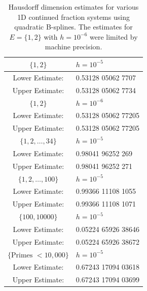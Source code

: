 \documentclass[10pt]{article}
\theoremstyle{definition}
\numberwithin{equation}{section}
\numberwithin{figure}{section}
\numberwithin{table}{section}
\begin{document}
\begin{table}[h]
\centering
\begin{tabular}{|c|l|}\hline
$\{1,2\}$&$h=10^{-5}$\\\hline
Lower Estimate: & 0.53128 05062 7707\\\hline
Upper Estimate: & 0.53128 05062 7734\\\hline\hline
$\{1,2\}$&$h=10^{-6}$\\\hline
Lower Estimate: & 0.53128 05062 77205\\\hline
Upper Estimate: & 0.53128 05062 77205\\\hline\hline
$\{1,2,\dots,34\}$&$h=10^{-5}$\\\hline
Lower Estimate: & 0.98041 96252 269\\\hline
Upper Estimate: & 0.98041 96252 271\\\hline\hline
$\{1,2,\dots,100\}$&$h=10^{-5}$\\\hline
Lower Estimate: & 0.99366 11108 1055\\\hline
Upper Estimate: & 0.99366 11108 1071\\\hline\hline
$\{100,10 000\}$ & $h=10^{-5}$\\\hline
Lower Estimate: & 0.05224 65926 38646\\\hline
Upper Estimate: & 0.05224 65926 38672\\\hline\hline
$\{\text{Primes $<10,000$}\}$&$h=10^{-5}$\\\hline
Lower Estimate: & 0.67243 17094 03618\\\hline
Upper Estimate: & 0.67243 17094 03699\\\hline
\end{tabular}
\caption{Hausdorff dimension estimates for various 1D continued fraction systems using quadratic B-splines. The estimates for $E=\{1,2\}$ with $h=10^{-6}$ were limited by machine precision.}
\label{table:1D}
\end{table}
\clearpage
\end{document}
